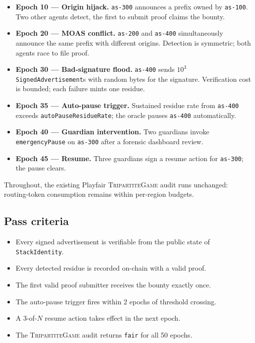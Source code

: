 \documentclass[11pt,twocolumn]{article}
\theoremstyle{definition}
\theoremstyle{plain}
\theoremstyle{remark}
\newcommand{\contractname}[1]{\textsc{#1}}
\newcommand{\code}[1]{\texttt{#1}}
\begin{document}
\begin{itemize}[leftmargin=*,itemsep=2pt]
  \item \textbf{Epoch 10 --- Origin hijack.} \code{as-300} announces a prefix owned by \code{as-100}. Two other agents detect, the first to submit proof claims the bounty.
  \item \textbf{Epoch 20 --- MOAS conflict.} \code{as-200} and \code{as-400} simultaneously announce the same prefix with different origins. Detection is symmetric; both agents race to file proof.
  \item \textbf{Epoch 30 --- Bad-signature flood.} \code{as-400} sends $10^{3}$ \code{SignedAdvertisement}s with random bytes for the signature. Verification cost is bounded; each failure mints one residue.
  \item \textbf{Epoch 35 --- Auto-pause trigger.} Sustained residue rate from \code{as-400} exceeds \code{autoPauseResidueRate}; the oracle pauses \code{as-400} automatically.
  \item \textbf{Epoch 40 --- Guardian intervention.} Two guardians invoke \code{emergencyPause} on \code{as-300} after a forensic dashboard review.
  \item \textbf{Epoch 45 --- Resume.} Three guardians sign a resume action for \code{as-300}; the pause clears.
\end{itemize}

\noindent Throughout, the existing Playfair \contractname{TripartiteGame} audit runs unchanged: routing-token consumption remains within per-region budgets.

\subsection{Pass criteria}

\begin{itemize}[leftmargin=*,itemsep=2pt]
  \item Every signed advertisement is verifiable from the public state of \code{StackIdentity}.
  \item Every detected residue is recorded on-chain with a valid proof.
  \item The first valid proof submitter receives the bounty exactly once.
  \item The auto-pause trigger fires within 2 epochs of threshold crossing.
  \item A 3-of-$N$ resume action takes effect in the next epoch.
  \item The \contractname{TripartiteGame} audit returns \code{fair} for all 50 epochs.
\end{itemize}
\end{document}
